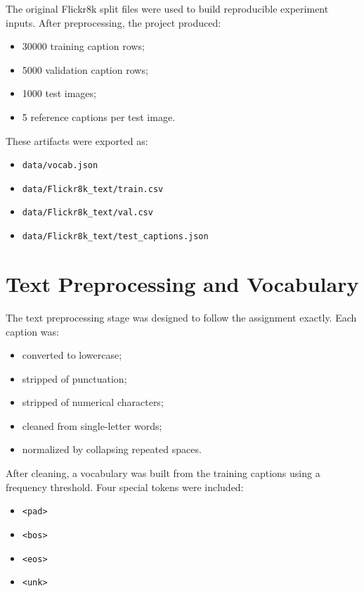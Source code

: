 \documentclass[11pt,a4paper]{article}
\begin{document}
The original Flickr8k split files were used to build reproducible experiment inputs. After preprocessing, the project produced:
\begin{itemize}[leftmargin=*]
    \item 30000 training caption rows;
    \item 5000 validation caption rows;
    \item 1000 test images;
    \item 5 reference captions per test image.
\end{itemize}

These artifacts were exported as:
\begin{itemize}[leftmargin=*]
    \item \texttt{data/vocab.json}
    \item \texttt{data/Flickr8k\_text/train.csv}
    \item \texttt{data/Flickr8k\_text/val.csv}
    \item \texttt{data/Flickr8k\_text/test\_captions.json}
\end{itemize}

\section{Text Preprocessing and Vocabulary}

The text preprocessing stage was designed to follow the assignment exactly. Each caption was:
\begin{itemize}[leftmargin=*]
    \item converted to lowercase;
    \item stripped of punctuation;
    \item stripped of numerical characters;
    \item cleaned from single-letter words;
    \item normalized by collapsing repeated spaces.
\end{itemize}

After cleaning, a vocabulary was built from the training captions using a frequency threshold. Four special tokens were included:
\begin{itemize}[leftmargin=*]
    \item \texttt{<pad>}
    \item \texttt{<bos>}
    \item \texttt{<eos>}
    \item \texttt{<unk>}
\end{itemize}
\end{document}

